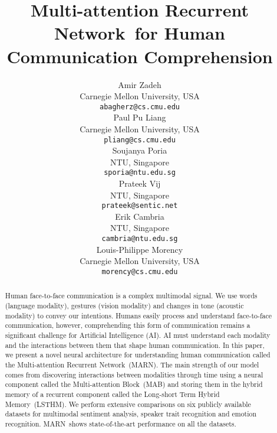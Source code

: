 \documentclass[letterpaper]{article} \usepackage{aaai18}  \usepackage{times}  \usepackage{helvet}  \usepackage{courier}  \usepackage{url}  \usepackage{graphicx}  \usepackage{multirow}
\newcommand{\pipeline}{Multi-attention Recurrent Network}
\newcommand{\pipelines}{MARN}
\newcommand{\mab}{Multi-attention Block}
\newcommand{\mabs}{MAB}
\newcommand{\tname}{Long-short Term Hybrid Memory}
\newcommand{\tnames}{LSTHM}
\begin{document}
\title{\pipeline \ for Human Communication Comprehension}


\author{
Amir Zadeh\\
Carnegie Mellon University, USA \\
{\tt abagherz@cs.cmu.edu} \\ \And
Paul Pu Liang\\
Carnegie Mellon University, USA \\
{\tt pliang@cs.cmu.edu} \\ \And
Soujanya Poria \\
NTU, Singapore \\
{\tt sporia@ntu.edu.sg} \\ \AND
Prateek Vij \\
NTU, Singapore \\
{\tt prateek@sentic.net} \\ \And
Erik Cambria \\
NTU, Singapore \\
{\tt cambria@ntu.edu.sg} \\ \And
Louis-Philippe Morency \\
Carnegie Mellon University, USA\\
{\tt morency@cs.cmu.edu}\\
}
\maketitle


\begin{abstract}
Human face-to-face communication is a complex multimodal signal. We use words (language modality), gestures (vision modality) and changes in tone (acoustic modality) to convey our intentions. Humans easily process and understand face-to-face communication, however, comprehending this form of communication remains a significant challenge for Artificial Intelligence (AI). AI must understand each modality and the interactions between them that shape human communication. In this paper, we present a novel neural architecture for understanding human communication called the \pipeline \ (\pipelines). The main strength of our model comes from discovering interactions between modalities through time using a neural component called the \mab \ (\mabs) and storing them in the hybrid memory of a recurrent component called the \tname \ (\tnames). We perform extensive comparisons on six publicly available datasets for multimodal sentiment analysis, speaker trait recognition and emotion recognition. \pipelines \ shows state-of-the-art performance on all the datasets. 
\end{abstract}
\end{document}
